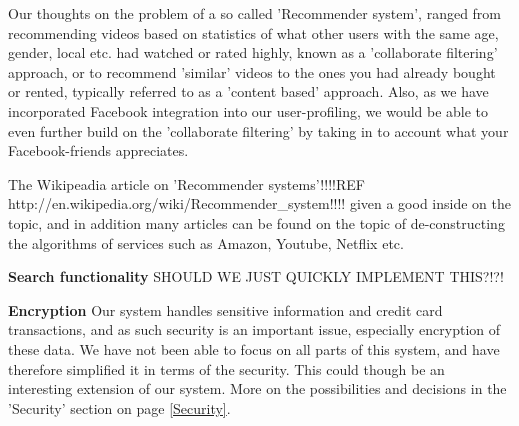 Our thoughts on the problem of a so called 'Recommender system', ranged from recommending videos based on statistics of what other users with the same age, gender, local etc. had watched or rated highly, known as a 'collaborate filtering' approach, or to recommend 'similar' videos to the ones you had already bought or rented, typically referred to as a 'content based' approach. Also, as we have incorporated Facebook integration into our user-profiling, we would be able to even further build on the 'collaborate filtering' by taking in to account what your Facebook-friends appreciates. \

The Wikipeadia article on 'Recommender systems'!!!!REF http://en.wikipedia.org/wiki/Recommender_system!!!! given a good inside on the topic, and in addition many articles can be found on the topic of de-constructing the algorithms of services such as Amazon, Youtube, Netflix etc. \

\textbf{Search functionality}
SHOULD WE JUST QUICKLY IMPLEMENT THIS?!?!\

\textbf{Encryption}
Our system handles sensitive information and credit card transactions, and as such security is an important issue, especially encryption of these data. We have not been able to focus on all parts of this system, and have therefore simplified it in terms of the security. This could though be an interesting extension of our system. More on the possibilities and decisions in the 'Security' section on page \ref{Security}. \





 